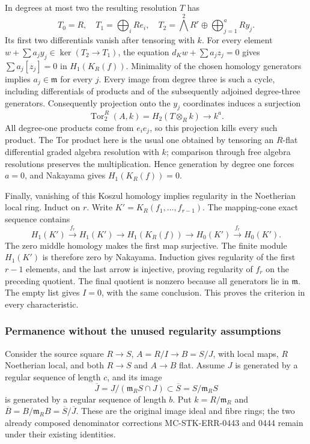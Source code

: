 In degrees at most two the resulting resolution \(T\) has \[
T_0=R,\quad T_1=\bigoplus_i Re_i,\quad
T_2=\bigwedge^2R^r\oplus\bigoplus_{j=1}^a Ry_j.
\] Its first two differentials vanish after tensoring with \(k\). For every element \(w+\sum a_jy_j\in\ker(T_2\to T_1)\), the equation \(d_Kw+\sum a_jz_j=0\) gives \(\sum a_j[z_j]=0\) in \(H_1(K_R(f))\). Minimality of the chosen homology generators implies \(a_j\in\mathfrak m\) for every \(j\). Every image from degree three is such a cycle, including differentials of products and of the subsequently adjoined degree-three generators. Consequently projection onto the \(y_j\) coordinates induces a surjection \[
\operatorname{Tor}^R_2(A,k)=H_2(T\otimes_R k)\longrightarrow k^a.
\] All degree-one products come from \(e_i e_j\), so this projection kills every such product. The Tor product here is the usual one obtained by tensoring an \(R\)-flat differential graded algebra resolution with \(k\); comparison through free algebra resolutions preserves the multiplication. Hence generation by degree one forces \(a=0\), and Nakayama gives \(H_1(K_R(f))=0\).

Finally, vanishing of this Koszul homology implies regularity in the Noetherian local ring. Induct on \(r\). Write \(K'=K_R(f_1,\ldots,f_{r-1})\). The mapping-cone exact sequence contains \[
H_1(K')\xrightarrow{f_r}H_1(K')\to H_1(K_R(f))
\to H_0(K')\xrightarrow{f_r}H_0(K').
\] The zero middle homology makes the first map surjective. The finite module \(H_1(K')\) is therefore zero by Nakayama. Induction gives regularity of the first \(r-1\) elements, and the last arrow is injective, proving regularity of \(f_r\) on the preceding quotient. The final quotient is nonzero because all generators lie in \(\mathfrak m\). The empty list gives \(I=0\), with the same conclusion. This proves the criterion in every characteristic.

\subsubsection{Permanence without the unused regularity assumptions}\label{algebra-proof-045-permanence-without-the-unused-regularity-assumptions}

Consider the source square \(R\to S\), \(A=R/I\to B=S/J\), with local maps, \(R\) Noetherian local, and both \(R\to S\) and \(A\to B\) flat. Assume \(J\) is generated by a regular sequence of length \(c\), and its image \[
\overline J=J/(\mathfrak m_RS\cap J)\subset\overline S=S/\mathfrak m_RS
\] is generated by a regular sequence of length \(b\). Put \(k=R/\mathfrak m_R\) and \(\overline B=B/\mathfrak m_RB=\overline S/\overline J\). These are the original image ideal and fibre rings; the two already composed denominator corrections MC-STK-ERR-0443 and 0444 remain under their existing identities.

